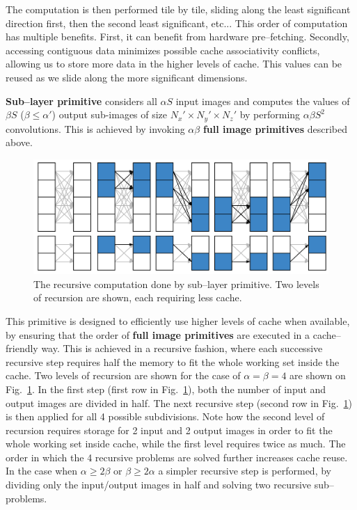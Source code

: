   The computation is then performed tile by tile, sliding along the
  least significant direction first, then the second least
  significant, etc...  This order of computation has multiple
  benefits.  First, it can benefit from hardware pre--fetching.
  Secondly, accessing contiguous data minimizes possible cache
  associativity conflicts, allowing us to store more data in the
  higher levels of cache.  This values can be reused as we slide along
  the more significant dimensions.

  {\bf Sub--layer primitive} considers all $\alpha S$ input images and
  computes the values of $\beta S$ ($\beta \le \alpha'$) output
  sub-images of size $N_x' \times N_y' \times N_z'$ by performing
  $\alpha \beta S^2$ convolutions.  This is achieved by invoking
  $\alpha \beta$ {\bf full image primitives} described above.

  \begin{figure}
    \begin{center}
      \includegraphics[width=0.8\linewidth]{fig/serialexec}
    \end{center}
    \caption{The recursive computation done by sub--layer primitive.
      Two levels of recursion are shown, each requiring less cache. }
    \label{fig:full-exec}
  \end{figure}

  This primitive is designed to efficiently use higher levels of cache
  when available, by ensuring that the order of {\bf full image
    primitives} are executed in a cache--friendly way.  This is
  achieved in a recursive fashion, where each successive recursive
  step requires half the memory to fit the whole working set inside
  the cache.  Two levels of recursion are shown for the case of
  $\alpha = \beta = 4$ are shown on Fig.~\ref{fig:full-exec}.  In the
  first step (first row in Fig.~\ref{fig:full-exec}), both the number
  of input and output images are divided in half.  The next recursive
  step (second row in Fig.~\ref{fig:full-exec}) is then applied for
  all 4 possible subdivisions.  Note how the second level of recursion
  requires storage for 2 input and 2 output images in order to fit the
  whole working set inside cache, while the first level requires twice
  as much.  The order in which the 4 recursive problems are solved
  further increases cache reuse.  In the case when $\alpha \ge 2\beta$
  or $\beta \ge 2\alpha$ a simpler recursive step is performed, by
  dividing only the input/output images in half and solving two
  recursive sub--problems.

